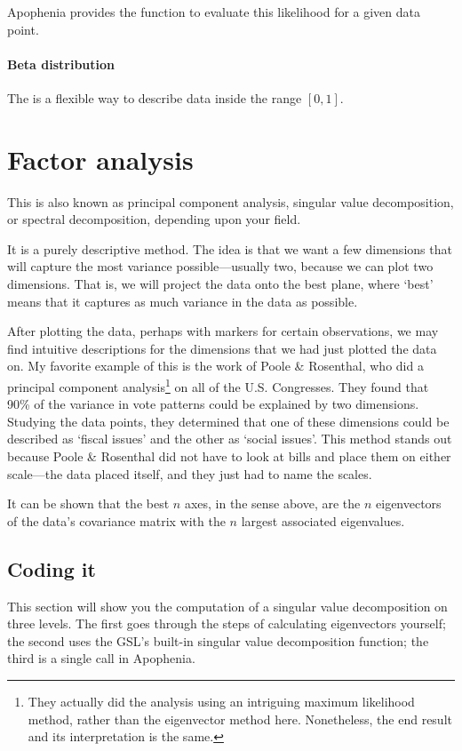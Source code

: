 Apophenia provides the function  to evaluate this likelihood for a given data point.

\paragraph{Beta distribution} The  is a flexible way to
describe data inside the range $[0, 1]$.  





\section{Factor analysis} \label{pca} 
This is also known as principal component
analysis, singular value decomposition, or spectral decomposition, depending upon your field. 

It is a purely descriptive method.  The idea is that we want a few
dimensions that will capture the most variance possible---usually two,
because we can plot two dimensions. That is, we will project the data
onto the best plane, where `best' means that it captures as much
variance in the data as possible.

After plotting the data, perhaps with markers for certain observations,
we may find intuitive descriptions for the dimensions that we had just plotted the
data on. My favorite example of this is the work of Poole \& Rosenthal,
who did a principal component analysis\footnote{They actually did
the analysis using an intriguing maximum likelihood method, rather
than the eigenvector method here. Nonetheless, the end result and its
interpretation is the same.} on all of the U.S. Congresses. They found
that 90\% of the variance in vote patterns could be explained by two dimensions.
Studying the data points, they determined that one of these dimensions could be
described as `fiscal issues' and the other as `social issues'. This method stands
out because Poole \& Rosenthal did not have to look at bills and place them on
either scale---the data placed itself, and they just had to name the scales.


It can be shown that the best $n$ axes, in the sense above, are the
$n$ eigenvectors of the data's covariance matrix with the $n$ largest
associated eigenvalues.

\subsection{Coding it}
This section will show you the computation of a singular value
decomposition on three levels. The first goes through the steps of
calculating eigenvectors yourself; the second uses the 
GSL's built-in singular value decomposition function; the third is a
single call in Apophenia.

